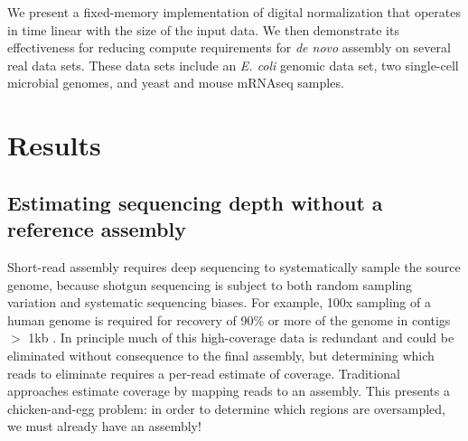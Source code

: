 \documentclass[10pt]{article}
\begin{document}


We present a fixed-memory implementation of digital normalization that
operates in time linear with the size of the input data.  We then
demonstrate its effectiveness for reducing compute requirements for
{\em de novo} assembly on several real data sets.  These data sets
include an {\em E. coli} genomic data set, two single-cell microbial
genomes, and yeast and mouse mRNAseq samples.

\section*{Results}

\subsection*{Estimating sequencing depth without a reference assembly}

Short-read assembly requires deep sequencing to systematically sample
the source genome, because shotgun sequencing is subject to both
random sampling variation and systematic sequencing biases.  For
example, 100x sampling of a human genome is required for recovery of
90\% or more of the genome in contigs $>$ 1kb \cite{pubmed21187386}.
In principle much of this high-coverage data is redundant and could be
eliminated without consequence to the final assembly, but determining
which reads to eliminate requires a per-read estimate of coverage.
Traditional approaches estimate coverage by mapping reads to an
assembly.  This presents a chicken-and-egg problem: in order to
determine which regions are oversampled, we must already have an
assembly!
\end{document}

